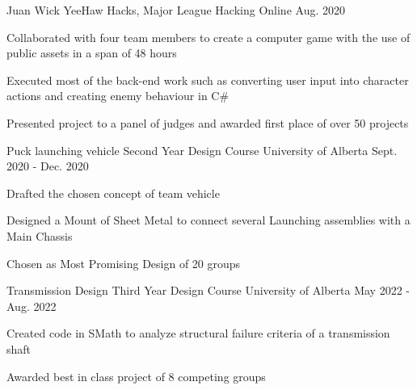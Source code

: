 

\begin{cventries}

  \cventry
    {Juan Wick} %
    {YeeHaw Hacks, Major League Hacking} %
    {Online} %
    {Aug. 2020} %
    {
      \begin{cvitems} %
        \item Collaborated with four team members to create a computer game with the
        use of public assets in a span of 48 hours
        \item Executed most of the back-end work such as converting user input into
        character actions and creating enemy behaviour in C\#
        \item Presented project to a panel of judges and awarded first place of over 50
        projects
      \end{cvitems}
    }

\cventry
{Puck launching vehicle} %
{Second Year Design Course} %
{University of Alberta} %
{Sept. 2020 - Dec. 2020} %
{
  \begin{cvitems} %
    \item Drafted the chosen concept of team vehicle
    \item Designed a Mount of Sheet Metal to connect several Launching assemblies with a Main Chassis
    \item Chosen as Most Promising Design of 20 groups
  \end{cvitems}
}

\cventry
{Transmission Design} %
{Third Year Design Course} %
{University of Alberta} %
{May 2022 - Aug. 2022} %
{
  \begin{cvitems} %
    \item Created code in SMath to analyze structural failure criteria of a transmission shaft
    \item Awarded best in class project of 8 competing groups
  \end{cvitems}
}


\end{cventries}
